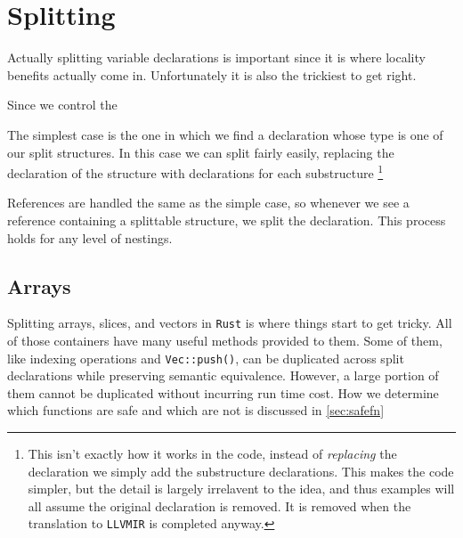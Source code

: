 \documentclass[12pt,oneside]{book}
\newcommand{\rustname}{{\texttt{Rust}}}
\def \rust {\rustname{}\xspace}
\newcommand{\llvmirname}{{\texttt{LLVMIR}}}
\def \llvmir {\llvmirname{}\xspace}
\begin{document}





  

\section{Splitting}
\label{sec:splitting}

Actually splitting variable declarations is important since it is where
locality benefits actually come in. Unfortunately it is also the trickiest
to get right.

Since we control the 

The simplest case is the one in which
we find a declaration whose type is one of our split structures. In this 
case we can split fairly easily, replacing the declaration of the structure with
declarations for each substructure
\footnote{This isn't exactly how it works in the code,
instead of \textit{replacing} the declaration we simply add the substructure declarations.
This makes the code simpler, but the detail is largely irrelavent to the
idea, and thus examples will all assume the original declaration is removed.
It is removed when the translation to \llvmir is completed anyway.}

References are handled the same as the simple case, so whenever we 
see a reference containing a splittable structure, we split the declaration.
This process holds for any level of nestings. 

\subsection{Arrays}
Splitting arrays, slices, and vectors in \rust is where things start
to get tricky. All of those containers have many useful methods
provided to them. Some of them, like indexing operations 
and \texttt{Vec::push()}, can be duplicated across split declarations
while preserving semantic equivalence. However, a large portion of them
cannot be duplicated without incurring run time cost. How we determine which
functions are safe and which are not is discussed in \ref{sec:safefn}
\end{document}
